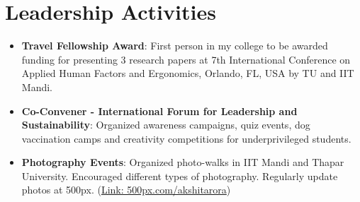 \documentclass[letterpaper,11pt]{article}
\newcommand{\resumeItem}[2]{
  \item\small{
    \textbf{#1}{: #2 \vspace{-2pt}}
  }
}
\newcommand{\resumeSubItem}[2]{\resumeItem{#1}{#2}\vspace{-4pt}}
\newcommand{\resumeSubHeadingListStart}{\begin{itemize}[leftmargin=*]}
\newcommand{\resumeSubHeadingListEnd}{\end{itemize}}
\begin{document}
\section{Leadership Activities}
  \resumeSubHeadingListStart
  \resumeSubItem{Travel Fellowship Award}
      {First person in my college to be awarded funding  for presenting 3 research papers at 7th International Conference on Applied Human Factors and Ergonomics, Orlando, FL, USA by TU and IIT Mandi.}
  \resumeSubItem{Co-Convener - International Forum for Leadership and Sustainability}
    {Organized awareness campaigns, quiz events, dog vaccination camps and creativity competitions for underprivileged students.}
    \resumeSubItem{Photography Events}
      {Organized photo-walks in IIT Mandi and Thapar University. Encouraged different types of photography. Regularly update photos at 500px. (\href{https://500px.com/akshitarora}{Link: 500px.com/akshitarora})}
      
  \resumeSubHeadingListEnd

\end{document}
